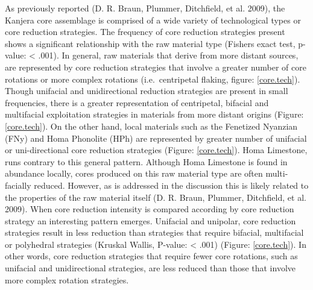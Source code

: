 \documentclass[]{elsarticle} %
\begin{document}
As previously reported (D. R. Braun, Plummer, Ditchfield, et al. 2009),
the Kanjera core assemblage is comprised of a wide variety of
technological types or core reduction strategies. The frequency of core
reduction strategies present shows a significant relationship with the
raw material type (Fishers exact test, p-value: \textless{} .001). In
general, raw materials that derive from more distant sources, are
represented by core reduction strategies that involve a greater number
of core rotations or more complex rotations (i.e.~centripetal flaking,
figure: \ref{core.tech}). Though unifacial and unidirectional reduction
strategies are present in small frequencies, there is a greater
representation of centripetal, bifacial and multifacial exploitation
strategies in materials from more distant origins (Figure:
\ref{core.tech}). On the other hand, local materials such as the
Fenetized Nyanzian (FNy) and Homa Phonolite (HPh) are represented by
greater number of unifacial or uni-directional core reduction strategies
(Figure: \ref{core.tech}). Homa Limestone, runs contrary to this general
pattern. Although Homa Limestone is found in abundance locally, cores
produced on this raw material type are often multi-facially reduced.
However, as is addressed in the discussion this is likely related to the
properties of the raw material itself (D. R. Braun, Plummer, Ditchfield,
et al. 2009). When core reduction intensity is compared according by
core reduction strategy an interesting pattern emerges. Unifacial and
unipolar, core reduction strategies result in less reduction than
strategies that require bifacial, multifacial or polyhedral strategies
(Kruskal Wallis, P-value: \textless{} .001) (Figure: \ref{core.tech}).
In other words, core reduction strategies that require fewer core
rotations, such as unifacial and unidirectional strategies, are less
reduced than those that involve more complex rotation strategies.
\end{document}
